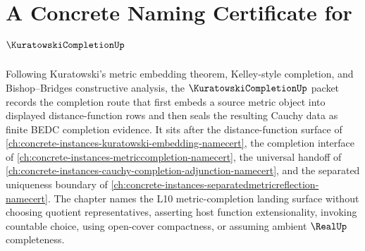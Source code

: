 \chapter{A Concrete Naming Certificate for $\KuratowskiCompletionUp$}
\label{ch:concrete-instances-kuratowski-completion-namecert}

Following Kuratowski's metric embedding theorem, Kelley-style completion, and Bishop--Bridges constructive analysis, the $\KuratowskiCompletionUp$ packet records the completion route that first embeds a source metric object into displayed distance-function rows and then seals the resulting Cauchy data as finite BEDC completion evidence. It sits after the distance-function surface of \autoref{ch:concrete-instances-kuratowski-embedding-namecert}, the completion interface of \autoref{ch:concrete-instances-metriccompletion-namecert}, the universal handoff of \autoref{ch:concrete-instances-cauchy-completion-adjunction-namecert}, and the separated uniqueness boundary of \autoref{ch:concrete-instances-separatedmetricreflection-namecert}. The chapter names the L10 metric-completion landing surface without choosing quotient representatives, asserting host function extensionality, invoking countable choice, using open-cover compactness, or assuming ambient $\RealUp$ completeness.

